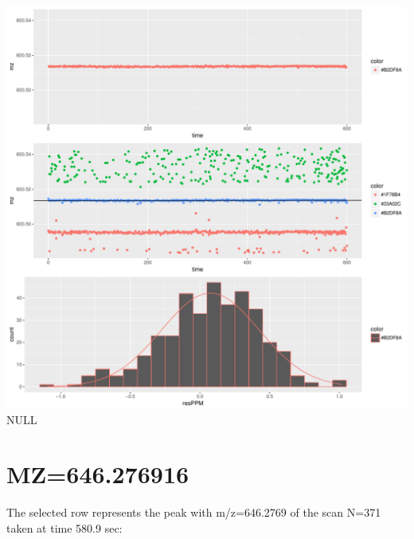\documentclass[]{article}
\newenvironment{Shaded}{\begin{snugshade}}{\end{snugshade}}
\newcommand{\KeywordTok}[1]{\textcolor[rgb]{0.13,0.29,0.53}{\textbf{#1}}}
\newcommand{\FloatTok}[1]{\textcolor[rgb]{0.00,0.00,0.81}{#1}}
\newcommand{\OperatorTok}[1]{\textcolor[rgb]{0.81,0.36,0.00}{\textbf{#1}}}
\newcommand{\NormalTok}[1]{#1}
\begin{document}
\includegraphics{Supplementary_document_files/figure-latex/filter.lm.600-1.pdf}
NULL

\section{MZ=646.276916}\label{mz646.276916}

\begin{Shaded}
\end{Shaded}

The selected row represents the peak with m/z=646.2769 of the scan N=371
taken at time 580.9 sec:

\begin{Shaded}
\end{Shaded}
\end{document}

